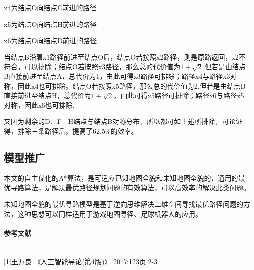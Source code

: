 \documentclass[withoutpreface,bwprint]{cumcmthesis} %
\begin{document}
\begin{enumerate}[itemindent=1em]
    \hspace*{0.5cm}
    x4为结点O向结点C前进的路径

    \hspace*{0.5cm}
    x5为结点O向结点H前进的路径

    \hspace*{0.5cm}
    x6为结点O向结点D前进的路径

    当结点B沿着x1路径前进至结点O后，结点O若按照x2路径，则是原路返回，x2不符合，可以排除；结点O若按照x3路径，那么总的代价值为$1+\sqrt{2}$,但若是由结点B直接前进至结点A，总代价为1，由此可得x3路径可排除；路径x4与路径x3对称，因此x4也可排除。结点O若按照x5路径，那么总的代价值为2,但若是由结点B直接前进至结点H，总代价为$1+\sqrt{2}$，由此可得x5路径可排除；路径x6与路径x5对称，因此x6也可排除.

    又因为剩余的D、F、H结点与结点B对称分布，所以都可如上述所排除，可论证得，排除三条路径后，提高了62.5\%的效率。

\end{enumerate}

\subsection{模型推广}

本文的自主优化的A*算法，是可适应已知地图全貌和未知地图全貌的，通用的最优寻路算法，是解决最优路径规划问题的有效算法，可以高效率的解决此类问题。

未知地图全貌的最优寻路模型是基于逆向思维解决二维空间寻找最优路径问题的方法，这种思想可以同样适用于游戏地图寻径、足球机器人的应用。

\newpage
\paragraph{参考文献}~{}
\\

[1]王万良 《人工智能导论(第4版)》 2017:123页 2-3

\newpage
\end{document}
